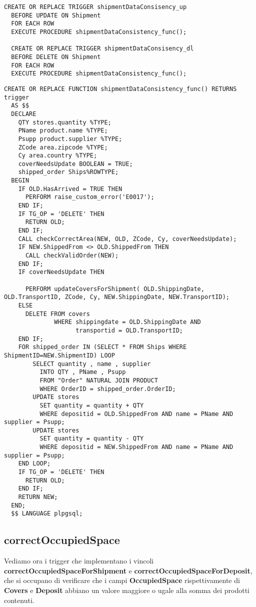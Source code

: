 \begin{lstlisting}[caption={Trigger per \textbf{UPDATE/DELETE ON Shipment}}]
  CREATE OR REPLACE TRIGGER shipmentDataConsisency_up
  BEFORE UPDATE ON Shipment
  FOR EACH ROW
  EXECUTE PROCEDURE shipmentDataConsistency_func();

  CREATE OR REPLACE TRIGGER shipmentDataConsisency_dl
  BEFORE DELETE ON Shipment
  FOR EACH ROW
  EXECUTE PROCEDURE shipmentDataConsistency_func();
\end{lstlisting}
\newpage
\begin{lstlisting}[caption={Funzione completa}]
  CREATE OR REPLACE FUNCTION shipmentDataConsistency_func() RETURNS trigger
  AS $$
  DECLARE
    QTY stores.quantity %TYPE;
    PName product.name %TYPE;
    Psupp product.supplier %TYPE;
    ZCode area.zipcode %TYPE;
    Cy area.country %TYPE;
    coverNeedsUpdate BOOLEAN = TRUE;
    shipped_order Ships%ROWTYPE;
  BEGIN
    IF OLD.HasArrived = TRUE THEN
      PERFORM raise_custom_error('E0017');
    END IF;
    IF TG_OP = 'DELETE' THEN
      RETURN OLD;
    END IF;
    CALL checkCorrectArea(NEW, OLD, ZCode, Cy, coverNeedsUpdate);
    IF NEW.ShippedFrom <> OLD.ShippedFrom THEN
      CALL checkValidOrder(NEW);
    END IF;
    IF coverNeedsUpdate THEN

      PERFORM updateCoversForShipment( OLD.ShippingDate, OLD.TransportID, ZCode, Cy, NEW.ShippingDate, NEW.TransportID);
    ELSE 
      DELETE FROM covers 
              WHERE shippingdate = OLD.ShippingDate AND 
                    transportid = OLD.TransportID;
    END IF;
    FOR shipped_order IN (SELECT * FROM Ships WHERE ShipmentID=NEW.ShipmentID) LOOP
        SELECT quantity , name , supplier 
          INTO QTY , PName , Psupp
          FROM "Order" NATURAL JOIN PRODUCT
          WHERE OrderID = shipped_order.OrderID;
        UPDATE stores
          SET quantity = quantity + QTY
          WHERE depositid = OLD.ShippedFrom AND name = PName AND supplier = Psupp;
        UPDATE stores
          SET quantity = quantity - QTY
          WHERE depositid = NEW.ShippedFrom AND name = PName AND supplier = Psupp;
    END LOOP;
    IF TG_OP = 'DELETE' THEN
      RETURN OLD;
    END IF;
    RETURN NEW;
  END;
  $$ LANGUAGE plpgsql;
\end{lstlisting}

\subsection{\textbf{correctOccupiedSpace}}

Vediamo ora i trigger che implementano i vincoli \textbf{correctOccupiedSpaceForShipment} e \textbf{correctOccupiedSpaceForDeposit}, che si occupano di verificare che i campi \textbf{OccupiedSpace} rispettivamente di \textbf{Covers} e \textbf{Deposit} abbiano un valore maggiore o ugale alla somma dei prodotti contenuti.

